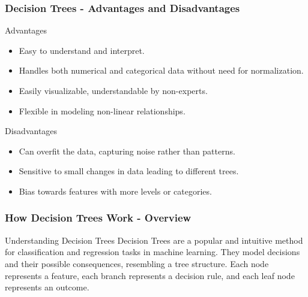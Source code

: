 \documentclass[aspectratio=169]{beamer}
\begin{document}
\begin{frame}[fragile]
    \frametitle{Decision Trees - Advantages and Disadvantages}
    
    \begin{block}{Advantages}
        \begin{itemize}
            \item Easy to understand and interpret.
            \item Handles both numerical and categorical data without need for normalization.
            \item Easily visualizable, understandable by non-experts.
            \item Flexible in modeling non-linear relationships.
        \end{itemize}
    \end{block}

    \begin{block}{Disadvantages}
        \begin{itemize}
            \item Can overfit the data, capturing noise rather than patterns.
            \item Sensitive to small changes in data leading to different trees.
            \item Bias towards features with more levels or categories.
        \end{itemize}
    \end{block}
\end{frame}

\begin{frame}[fragile]
    \frametitle{How Decision Trees Work - Overview}
    \begin{block}{Understanding Decision Trees}
        Decision Trees are a popular and intuitive method for classification and regression tasks in machine learning. They model decisions and their possible consequences, resembling a tree structure. Each node represents a feature, each branch represents a decision rule, and each leaf node represents an outcome.
    \end{block}
\end{frame}
\end{document}
